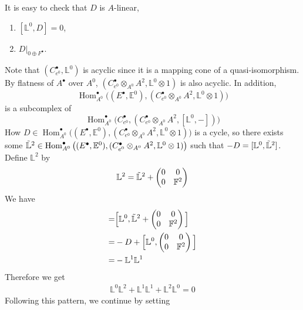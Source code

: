 \documentclass[12pt]{amsart}
\theoremstyle{definition}
\theoremstyle{remark}
\numberwithin{equation}{section}
\newcommand{\A}{{A}}
\newcommand{\1}{{\mathbb{1}}}
\newcommand{\bt}{\bullet}
\newcommand{\Hom}{\operatorname{Hom}}
\begin{document}
It is easy to check that $D$ is $\A$-linear, 
\begin{enumerate}
    \item $[\mathbb{L}^0, D] = 0$,\\
    \item $D|_{0\oplus F^{\bt}}$.
\end{enumerate}
Note that $(C_{e^0}^{\bt}, \mathbb{L}^0)$ is acyclic since it is a mapping cone of a quasi-isomorphism. By flatness of $\A^{\bt}$ over $\A^0$, $(C_{e^0}^{\bt}\otimes_{\A^0} \A^2, \mathbb{L}^0\otimes 1)$ is also acyclic. In addition,
\begin{equation*}
    \Hom^{\bt}_{\A^0}\big( (E^{\bt}, \mathbb{E}^0), (C_{e^0}^{\bt}\otimes_{\A^0} \A^2, \mathbb{L}^0\otimes 1) \big)
\end{equation*}
is a subcomplex of 
\begin{equation*}
    \Hom^{\bt}_{\A^0}\big(C_{e^0}^{\bt}, (C_{e^0}^{\bt}\otimes_{\A^0} \A^2, [\mathbb{L}^0, -]) \big) 
\end{equation*}
How $D\in \Hom^{\bt}_{\A^0}\big( (E^{\bt}, \mathbb{E}^0), (C_{e^0}^{\bt}\otimes_{\A^0} \A^2, \mathbb{L}^0\otimes 1) \big)$ is a cycle, so there exists some $\Tilde{\mathbb{L}}^2 \in \Hom^{\bt}_{\A^0}\big( (E^{\bt}, \mathbb{E}^0), (C_{e^0}^{\bt}\otimes_{\A^0} \A^2, \mathbb{L}^0\otimes 1) \big)$ such that $-D = [\mathbb{L}^0,\Tilde{\mathbb{L}}^2]$. Define $\mathbb{L}^2$ by
$$
\mathbb{L}^2 = \Tilde{\mathbb{L}}^2 + \begin{pmatrix}
0 & 0 \\
0 & \mathbb{F}^2
\end{pmatrix}
$$
We have 
\begin{align*}
    [\mathbb{L}^0,\mathbb{L}^2 ] =& \Big[\mathbb{L}^0,  \Tilde{\mathbb{L}}^2 + \begin{pmatrix}
0 & 0 \\
0 & \mathbb{F}^2
\end{pmatrix}\Big]\\
=& -D + \Big[\mathbb{L}^0,   \begin{pmatrix}
0 & 0 \\
0 & \mathbb{F}^2
\end{pmatrix}\Big]\\
=& -\mathbb{L}^1\mathbb{L}^1
\end{align*}
Therefore we get
\begin{align*}
    \mathbb{L}^0\mathbb{L}^2 + \mathbb{L}^1\mathbb{L}^1 + \mathbb{L}^2\mathbb{L}^0 = 0
\end{align*}
Following this pattern, we continue by setting
\end{document}
